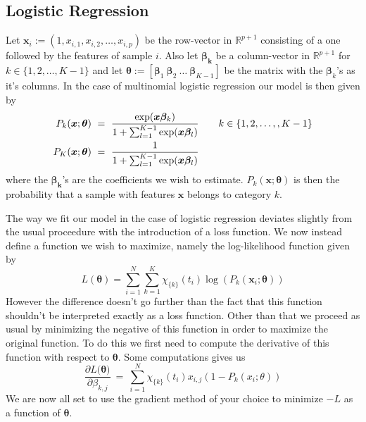 \documentclass[parskip=half]{scrartcl}
\theoremstyle{definition}
\theoremstyle{remark}
\newcommand{\R}{\mathbb{R}}
\begin{document}
\subsection{Logistic Regression}
Let $\bm{x}_i := (1, x_{i,1}, x_{i,2}, \dots, x_{i,p})$ 
be the row-vector in $\R^{p+1}$ consisting of a one followed by the 
features of sample $i$. Also let $\bm{\beta_k}$ be a column-vector in 
$\R^{p+1}$ for $k \in \{1,2, \dots, K-1\}$ and let 
$\bm{\theta} := [\bm{\beta}_1 \ \bm{\beta}_2 \ \dots \ \bm{\beta}_{K-1}]$ 
be the matrix with the $\bm{\beta}_k$'s as it's columns.
In the case of multinomial logistic regression our model is then given by
\begin{equation}
    \begin{split}
        P_k(\bm{x}; \bm{\theta}) \ = \ 
        \frac{\exp(\bm{x \beta}_k)}
        {1 + \sum_{l=1}^{K-1} \exp(\bm{x\beta_}l)}
        & \quad \quad k \in \{1,2, \dots, ,K - 1\}  \\
        P_K(\bm{x}; \bm{\theta}) \ = \ 
        \frac{1}
        {1 + \sum_{l=1}^{K-1} \exp(\bm{x\beta_}l)}
    \end{split}
\end{equation}
where the ${\bm{\beta_k}}$'s are the 
coefficients we wish to estimate. $P_k(\bm{x}; \bm{\theta})$ is then the 
probability that a sample with features $\bm{x}$ belongs to category $k$. 
\par
The way we fit our model in the case of logistic regression deviates
slightly from the usual proceedure with the introduction of a 
loss function. We now instead define a function we wish to
maximize, namely the log-likelihood function given by 
\begin{equation}
    L(\bm{\theta}) = \sum_{i=1}^N \sum_{k=1}^K 
    \chi_{\{k\}}(t_i) \log( P_k(\bm{x}_i; \bm{\theta}))
\end{equation}
However the difference doesn't go further than the fact that this function
shouldn't be interpreted exactly as a loss function. 
Other than that we proceed as usual by minimizing the negative of this 
function in order to maximize the original function. To do this we
first need to compute the derivative of this function with respect 
to $\bm{\theta}$. Some computations gives us
\begin{equation}
    \frac{\partial L (\bm{\theta)}}{\partial \beta_{k,j}} \ = \
    \sum_{i=1}^N \chi_{\{k\}}(t_i) x_{i,j} (1 - P_k(x_i ; \theta))
\end{equation}
We are now all set to use the gradient method of your choice to minimize
$-L$ as a function of $\bm{\theta}$.
\end{document}
